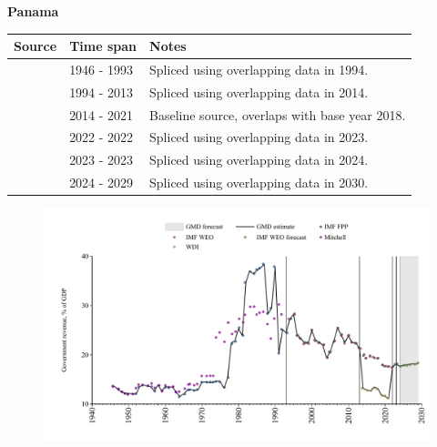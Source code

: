 \documentclass[12pt,a4paper,landscape]{article}
\begin{document}
\begin{adjustbox}{max totalsize={\paperwidth}{\paperheight},center}
\begin{minipage}[t][\textheight][t]{\textwidth}
\vspace*{0.5cm}
{}
\begin{center}
{\Large\bfseries Panama}
\end{center}
\vspace{0.5cm}
\begin{table}[H]
\centering
\small
\begin{tabular}{|l|l|l|}
\hline
\textbf{Source} & \textbf{Time span} & \textbf{Notes} \\
\hline
\rowcolor{white}\cite{IMF_FPP}& 1946 - 1993 &Spliced using overlapping data in 1994.\\
\rowcolor{lightgray}\cite{IMF_WEO}& 1994 - 2013 &Spliced using overlapping data in 2014.\\
\rowcolor{white}\cite{WDI}& 2014 - 2021 &Baseline source, overlaps with base year 2018.\\
\rowcolor{lightgray}\cite{IMF_WEO}& 2022 - 2022 &Spliced using overlapping data in 2023.\\
\rowcolor{white}\cite{IMF_FPP}& 2023 - 2023 &Spliced using overlapping data in 2024.\\
\rowcolor{lightgray}\cite{IMF_WEO_forecast}& 2024 - 2029 &Spliced using overlapping data in 2030.\\
\hline
\end{tabular}
\end{table}
\begin{figure}[H]
\centering
\includegraphics[width=\textwidth,height=0.6\textheight,keepaspectratio]{graphs/PAN_govrev_GDP.pdf}
\end{figure}
\end{minipage}
\end{adjustbox}
\end{document}
